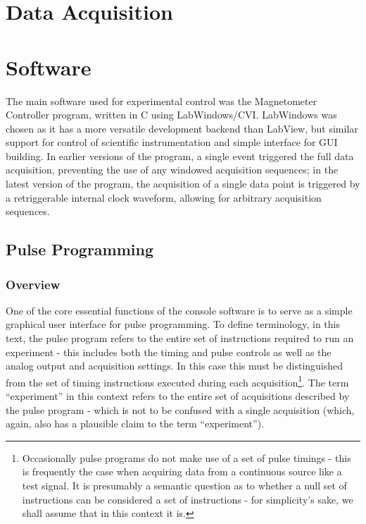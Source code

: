 \documentclass[PaulGanssle-Thesis.tex]{subfiles}
\begin{document}
\section{Data Acquisition}
\label{console.daq}

\section{Software}
\label{console.software}
The main software used for experimental control was the Magnetometer Controller program, written in C using LabWindows/CVI. LabWindows was chosen as it has a more versatile development backend than LabView, but similar support for control of scientific instrumentation and simple interface for GUI building. In earlier versions of the program, a single event triggered the full data acquisition, preventing the use of any windowed acquisition sequences; in the latest version of the program, the acquisition of a single data point is triggered by a retriggerable internal clock waveform, allowing for arbitrary acquisition sequences.

\subsection{Pulse Programming}
\label{Section:Console-Software-PulseProgramming}
\subsubsection{Overview}
\label{Section:Console-Software-PulseProgramming-Overview}
One of the core essential functions of the console software is to serve as a simple graphical user interface for pulse programming. To define terminology, in this text, the pulse program refers to the entire set of instructions required to run an experiment - this includes both the timing and pulse controls as well as the analog output and acquisition settings. In this case this must be distinguished from the set of timing instructions executed during each acquisition\footnote{Occasionally pulse programs do not make use of a set of pulse timings - this is frequently the case when acquiring data from a continuous source like a test signal. It is presumably a semantic question as to whether a null set of instructions can be considered a set of instructions - for simplicity's sake, we shall assume that in this context it is.}. The term ``experiment'' in this context refers to the entire set of acquisitions described by the pulse program - which is not to be confused with a single acquisition (which, again, also has a plausible claim to the term ``experiment''). 
\end{document}
